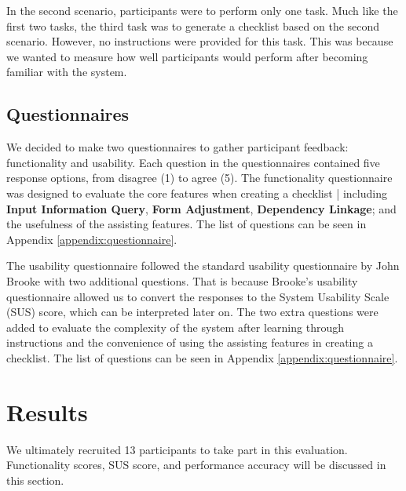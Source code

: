 In the second scenario, participants were to perform only one task. Much like the first two tasks, the third task was to generate a checklist based on the second scenario. However, no instructions were provided for this task. This was because we wanted to measure how well participants would perform after becoming familiar with the system.


\subsection{Questionnaires}
We decided to make two questionnaires to gather participant feedback: functionality and usability.
Each question in the questionnaires contained five response options, from disagree (1) to agree (5).
The functionality questionnaire was designed to evaluate the core features when creating a checklist | including \textbf{Input Information Query}, \textbf{Form Adjustment}, \textbf{Dependency Linkage}; and the usefulness of the assisting features.
The list of questions can be seen in Appendix \ref{appendix:questionnaire}.



The usability questionnaire followed the standard usability questionnaire by John Brooke \cite{susscores} with two additional questions. That is because Brooke's usability questionnaire allowed us to convert the responses to the System Usability Scale (SUS) score, which can be interpreted later on. The two extra questions were added to evaluate the complexity of the system after learning through instructions and the convenience of using the assisting features in creating a checklist.
The list of questions can be seen in Appendix \ref{appendix:questionnaire}.


\section{Results}
\label{eval:results}
We ultimately recruited 13 participants to take part in this evaluation.
Functionality scores, SUS score, and performance accuracy will be discussed in this section.

